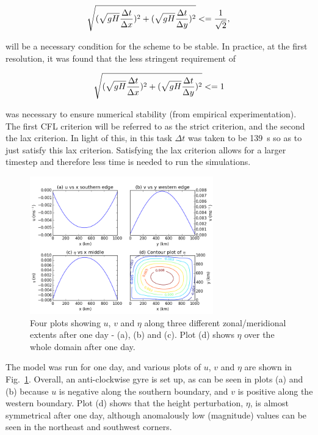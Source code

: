 \documentclass{article}
\begin{document}
\begin{equation}
    \label{eqn:cfl_strict} 
    \sqrt{(\sqrt{g H} \frac{\Delta t}{\Delta x})^2 + (\sqrt{g H} \frac{\Delta t}{\Delta y})^2} <=
    \frac{1}{\sqrt{2}},\\
\end{equation}

will be a necessary condition for the scheme to be stable. In practice, at the first resolution, it
was found that the less stringent requirement of

\begin{equation}
    \label{eqn:cfl_lax} 
    \sqrt{(\sqrt{g H} \frac{\Delta t}{\Delta x})^2 + (\sqrt{g H} \frac{\Delta t}{\Delta y})^2} <=
    1\\
\end{equation}

was necessary to ensure numerical stability (from empirical experimentation). The first CFL
criterion will be referred to as the strict criterion, and the second the lax criterion. In light of
this, in this task $\Delta t$ was taken to be \SI{139}{s} so as to just satisfy this lax criterion.
Satisfying the lax criterion allows for a larger timestep and therefore less time is needed to run
the simulations.

\begin{figure}[ht!]
    \centering
    \includegraphics[width=300px]{figures/task_a}
    \caption{Four plots showing $u$, $v$ and $\eta$ along three different zonal/meridional extents
	after one day - (a), (b) and (c). Plot (d) shows $\eta$ over the whole domain after one
    day.}
    \label{fig:task_a}
\end{figure}

The model was run for one day, and various plots of $u$, $v$ and $\eta$ are shown in Fig.\
\ref{fig:task_a}. Overall, an anti-clockwise gyre is set up, as can be seen in plots (a) and (b)
because $u$ is negative along the southern boundary, and $v$ is positive along the western boundary.
Plot (d) shows that the height perturbation, $\eta$, is almost symmetrical after one day, although
anomalously low (magnitude) values can be seen in the northeast and southwest corners.
\end{document}
